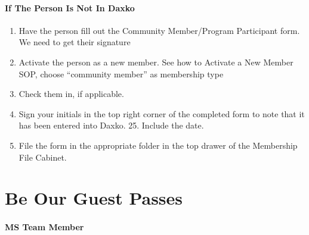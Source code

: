 \documentclass[
]{report}
\providecommand{\tightlist}{%
  \setlength{\itemsep}{0pt}\setlength{\parskip}{0pt}}\usepackage{longtable,booktabs,array}
\begin{document}
\hypertarget{if-the-person-is-not-in-daxko}{%
\subsubsection{If The Person Is Not In
Daxko}\label{if-the-person-is-not-in-daxko}}

\begin{enumerate}
\def\labelenumi{\arabic{enumi}.}
\setcounter{enumi}{20}
\tightlist
\item
  Have the person fill out the Community Member/Program Participant
  form.\hspace{0pt}\hspace{0pt} We need to get their signature
\item
  Activate the person as a new member. See how to Activate a New Member
  SOP, choose ``community member'' as membership type
\item
  Check them in, if applicable.
\item
  Sign your initials in the top right corner of the completed form to
  note that it has been entered into Daxko. 25. Include the date.
\item
  File the form in the appropriate folder in the top drawer of the
  Membership File Cabinet.
\end{enumerate}

\hypertarget{be-our-guest-passes}{%
\chapter{Be Our Guest Passes}\label{be-our-guest-passes}}

\hypertarget{ms-team-member-4}{%
\subsubsection{MS Team Member}\label{ms-team-member-4}}
\end{document}
